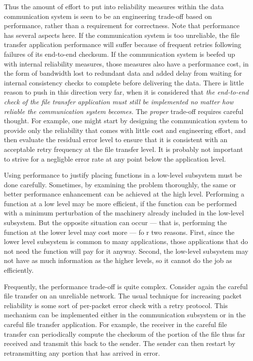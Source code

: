 \documentclass[a4paper,11pt,notitlepage,twoside,openright]{article}
\begin{document}
Thus the amount of effort to put into reliability measures within the
data communication system is seen to be an engineering trade-off based
on performance, rather than a requirement for correctness. Note that
performance has several aspects here. If the communication system is too
unreliable, the file transfer application performance will suffer
because of frequent retries following failures of its end-to-end
checksum. If the communication system is beefed up with internal
reliability measures, those measures also have a performance cost, in
the form of bandwidth lost to redundant data and added delay from
waiting for internal consistency checks to complete before delivering
the data. There is little reason to push in this direction very far,
when it is considered that \emph{the end-to-end check of the file
transfer application must still be implemented no matter how reliable
the communication system becomes.} The \emph{proper} trade-off requires
careful thought. For example, one might start by designing the
communication system to provide only the reliability that comes with
little cost and engineering effort, and then evaluate the residual error
level to ensure that it is consistent with an acceptable retry frequency
at the file transfer level. It is probably not important to strive for a
negligble error rate at any point below the application level.


Using performance to justify placing functions in a low-level subsystem
must be done carefully. Sometimes, by examining the problem thoroughly,
the same or better performance enhancement can be achieved at the high
level. Performing a function at a low level may be more efficient, if
the function can be performed with a minimum perturbation of the
machinery already included in the low-level subsystem. But the opposite
situation can occur --- that is, performing the function at the lower
level may cost more --- fo r two reasons. First, since the lower level
subsystem is common to many applications, those applications that do not
need the function will pay for it anyway. Second, the low-level
subsystem may not have as much information as the higher levels, so it
cannot do the job as efficiently.

Frequently, the performance trade-off is quite complex. Consider again
the careful file transfer on an unreliable network. The usual technique
for increasing packet reliability is some sort of per-packet error check
with a retry protocol. This mechanism can be implemented either in the
communication subsystem or in the careful file transfer application. For
example, the receiver in the careful file transfer can periodically
compute the checksum of the portion of the file thus far received and
transmit this back to the sender. The sender can then restart by
retransmitting any portion that has arrived in error.
\end{document}
